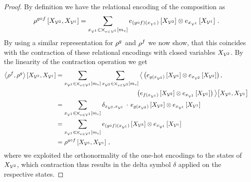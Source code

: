 \begin{proof}
	By definition we have the relational encoding of the composition as
	\begin{align*}
		\rho^{{g}\circ{f}}\left[X_{\mathcal{V}^{3}},X_{\mathcal{V}^{1}}\right]
		= \sum_{x_{\mathcal{V}^{1}}\in\bigtimes_{v\in\mathcal{V}^{1}}[m_{v}]}
		e_{({g}\circ{f})(x_{\mathcal{V}^{1}})}\left[X_{\mathcal{V}^{3}}\right] \otimes
		e_{x_{\mathcal{V}^{1}}}\left[X_{\mathcal{V}^{1}}\right]  \, .
	\end{align*}
	By using a similar representation for $\rho^{g}$ and $\rho^{f}$ we now show, that this coincides with the contraction of these relational encodings with closed variables $X_{\mathcal{V}^{2}}$.
	By the linearity of the contraction operation we get
	\begin{align*}
		\contractionof{\rencodingof{\exfunction},\rencodingof{\secexfunction}}{\catvariableof{\nodesthree},\catvariableof{\nodesone}}
		& = \sum_{\catindexof{\nodesone}\in\bigtimes_{\node\in\nodesone}[\catdimof{\node}]}
			\sum_{\catindexof{\nodestwo} \in \bigtimes_{\node\in\nodestwo}[\catdimof{\node}]}
			\breakablecontractionof{
				\left( \onehotmapofat{\secexfunctionat{\catindexof{\nodestwo}}}{\catvariableof{\nodesthree}} \otimes
				\onehotmapofat{\catindexof{\nodestwo}}{\catvariableof{\nodestwo}} \right), \\
				& \hspace{4.5cm} \left( \onehotmapofat{\exfunctionat{\catindexof{\nodesone}}}{\catvariableof{\nodestwo}} \otimes
				\onehotmapofat{\catindexof{\nodesone}}{\catvariableof{\nodesone}} \right)
			}{\catvariableof{\nodesthree},\catvariableof{\nodesone}} \\
		& = \sum_{\catindexof{\nodesone}\in\bigtimes_{\node\in\nodesone}[\catdimof{\node}]}
			\delta_{\catindexof{\nodestwo},\catindexof{\nodesone}} \, \cdot \,
			\onehotmapofat{\secexfunctionat{\catindexof{\nodestwo}}}{\catvariableof{\nodesthree}} \otimes
			\onehotmapofat{\catindexof{\nodesone}}{\catvariableof{\nodesone}} \\
		& = \sum_{\catindexof{\nodesone}\in\nodestatesof{\nodesone}}
		\onehotmapofat{\compositionofat{\secexfunction}{\exfunction}{\catindexof{\nodesone}}}{\catvariableof{\nodesthree}} \otimes
		\onehotmapofat{\catindexof{\nodesone}}{\catvariableof{\nodesone}} \\
		& = \rencodingofat{\compositionof{\secexfunction}{\exfunction}}{\catvariableof{\nodesthree},\catvariableof{\nodesone}} \, ,
	\end{align*}
	where we exploited the orthonormality of the one-hot encodings to the states of $X_{\mathcal{V}^{2}}$, which contraction thus results in the delta symbol $\delta$ applied on the respective states.
\end{proof}

